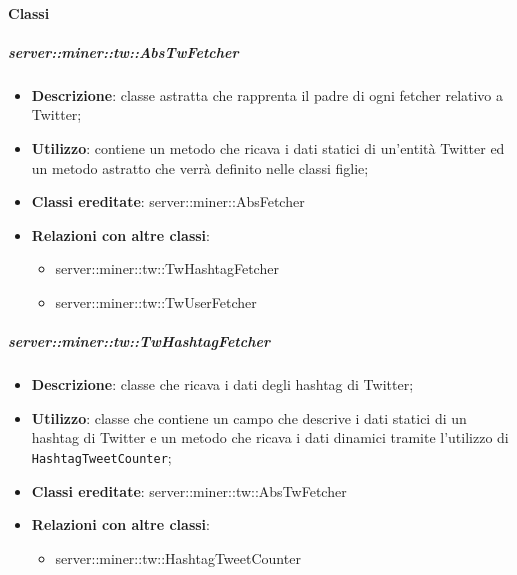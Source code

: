	\paragraph{Classi} %
	\subparagraph{server::miner::tw::AbsTwFetcher} %
		\label{subp:server_miner_tw_AbsTwFetcher}
			\begin{itemize}
				\item \textbf{Descrizione}: classe astratta che rapprenta il padre di ogni fetcher relativo a Twitter;
				\item \textbf{Utilizzo}: contiene un metodo che ricava i dati statici di un'entità Twitter ed un metodo astratto che verrà definito nelle classi figlie;
				\item \textbf{Classi ereditate}: server::miner::AbsFetcher
				\item \textbf{Relazioni con altre classi}:
					\begin{itemize}
						\item server::miner::tw::TwHashtagFetcher
						\item server::miner::tw::TwUserFetcher
					\end{itemize}
			\end{itemize}

	\subparagraph{server::miner::tw::TwHashtagFetcher} %
		\label{subp:server_miner_tw_TwHashtagFetcher}
			\begin{itemize}
				\item \textbf{Descrizione}: classe che ricava i dati degli hashtag di Twitter;
				\item \textbf{Utilizzo}: classe che contiene un campo che descrive i dati statici di un hashtag di Twitter e un metodo che ricava i dati dinamici tramite l'utilizzo di \texttt{HashtagTweetCounter};
				\item \textbf{Classi ereditate}: server::miner::tw::AbsTwFetcher
				\item \textbf{Relazioni con altre classi}:
					\begin{itemize}
						\item server::miner::tw::HashtagTweetCounter
					\end{itemize}
			\end{itemize}


